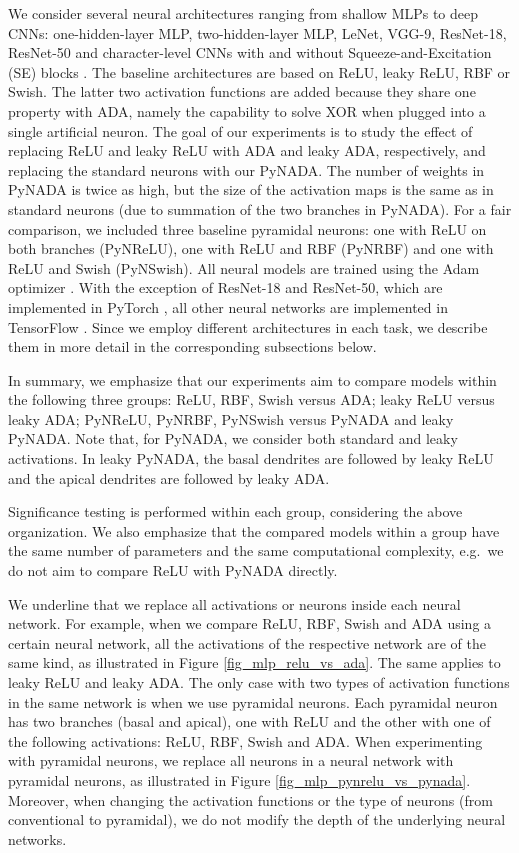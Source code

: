 \documentclass[pdflatex,sn-mathphys]{sn-jnl}
\theoremstyle{thmstyleone}
\theoremstyle{thmstyletwo}\newtheorem{example}{Example}\newtheorem{remark}{Remark}
\theoremstyle{thmstylethree}\newtheorem{definition}{Definition}\DeclareMathOperator{\sinc}{sinc}
\begin{document}
We consider several neural architectures ranging from shallow MLPs to deep CNNs: one-hidden-layer MLP, two-hidden-layer MLP, LeNet, VGG-9, ResNet-18, ResNet-50 and character-level CNNs with and without Squeeze-and-Excitation (SE) blocks \citep{Hu-CVPR-2018}. The baseline architectures are based on ReLU, leaky ReLU, RBF or Swish. The latter two activation functions are added because they share one property with ADA, namely the capability to solve XOR when plugged into a single artificial neuron. The goal of our experiments is to study the effect of  replacing ReLU and leaky ReLU with ADA and leaky ADA, respectively, and  replacing the standard neurons with our PyNADA. The number of weights in PyNADA is twice as high, but the size of the activation maps is the same as in standard neurons (due to summation of the two branches in PyNADA). For a fair comparison, we included three baseline pyramidal neurons: one with ReLU on both branches (PyNReLU), one with ReLU and RBF (PyNRBF) and one with ReLU and Swish (PyNSwish). All neural models are trained using the Adam optimizer \citep{Kingma-ICLR-2015}. With the exception of ResNet-18 and ResNet-50, which are implemented in PyTorch \citep{Paszke-NeurIPS-2019}, all other neural networks are implemented in TensorFlow \citep{Abadi-OSDI-2016}. Since we employ different architectures in each task, we describe them in more detail in the corresponding subsections below.

In summary, we emphasize that our experiments aim to compare models within the following three groups:
 ReLU, RBF, Swish versus ADA;  leaky ReLU versus leaky ADA;  PyNReLU, PyNRBF, PyNSwish versus PyNADA and leaky PyNADA. Note that, for PyNADA, we consider both standard and leaky activations. In leaky PyNADA, the basal dendrites are followed by leaky ReLU and the apical dendrites are followed by leaky ADA. 

Significance testing \cite{Dietterich-NC-1998} is performed within each group, considering the above organization. We also emphasize that the compared models within a group have the same number of parameters and the same computational complexity, e.g.~we do not aim to compare ReLU with PyNADA directly.

We underline that we replace all activations or neurons inside each neural network. For example, when we compare ReLU, RBF, Swish and ADA using a certain neural network, all the activations of the respective network are of the same kind, as illustrated in Figure \ref{fig_mlp_relu_vs_ada}. The same applies to leaky ReLU and leaky ADA. The only case with two types of activation functions in the same network is when we use pyramidal neurons. Each pyramidal neuron has two branches (basal and apical), one with ReLU and the other with one of the following activations: ReLU, RBF, Swish and ADA. When experimenting with pyramidal neurons, we replace all neurons in a neural network with pyramidal neurons, as illustrated in Figure \ref{fig_mlp_pynrelu_vs_pynada}. Moreover, when changing the activation functions or the type of neurons (from conventional to pyramidal), we do not modify the depth of the underlying neural networks.
\end{document}
